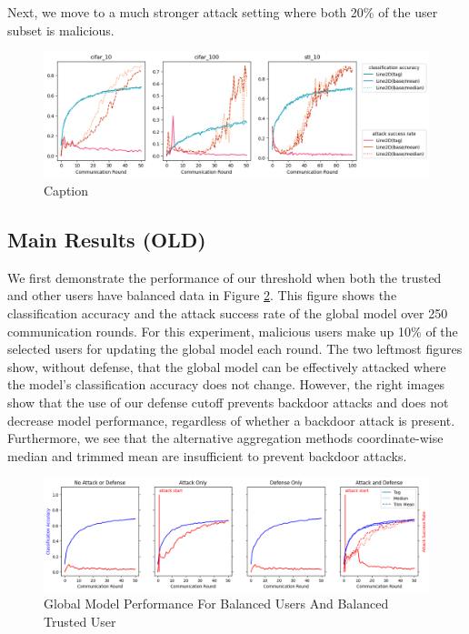 \documentclass{article} %
\begin{document}
Next, we move to a much stronger attack setting where both 20\% of the user subset is malicious.

\begin{figure}[H]
    \centering
    \includegraphics[width=\textwidth]{make_article/make_visuals/visuals/accuracy--n_malicious2--dba1--beta0.2.png}
    \caption{Caption}
    \label{fig:my_label}
\end{figure}

%
\pagebreak
\subsection{Main Results (OLD)}

We first demonstrate the performance of our threshold when both the trusted and other users have balanced data in Figure \ref{fig:centralized--balanced--accuracy}. This figure shows the classification accuracy and the attack success rate of the global model over 250 communication rounds. For this experiment, malicious users make up 10\% of the selected users for updating the global model each round. The two leftmost figures show, without defense, that the global model can be effectively attacked where the model's classification accuracy does not change. However, the right images show that the use of our defense cutoff prevents backdoor attacks and does not decrease model performance, regardless of whether a backdoor attack is present. Furthermore, we see that the alternative aggregation methods coordinate-wise median and trimmed mean are insufficient to prevent backdoor attacks.

\begin{figure}[H]
    \centering
    \includegraphics[width=\textwidth]{cifar_10/tag/distributed/alpha10000--alpha_val10000/visuals/accuracy--m_start1---dba1.png}
    \caption{Global Model Performance For Balanced Users And Balanced Trusted User}
    \label{fig:centralized--balanced--accuracy}
\end{figure}
\end{document}
